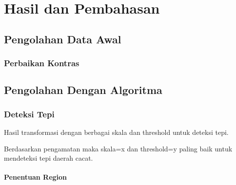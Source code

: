 \documentclass[laporan.tex]{subfiles}
\begin{document}
\chapter{Hasil dan Pembahasan}

\section{Pengolahan Data Awal}

\subsection{Perbaikan Kontras}

\section{Pengolahan Dengan Algoritma}

\subsection{Deteksi Tepi}

Hasil transformasi dengan berbagai skala dan threshold untuk deteksi tepi.

Berdasarkan pengamatan maka skala=x dan threshold=y paling baik untuk mendeteksi tepi daerah cacat.

\subsubsection{Penentuan Region}
\end{document}
